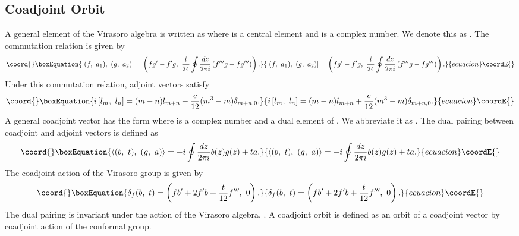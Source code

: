 \documentclass[a4paper,11pt]{article}
\begin{document}
\subsection{Coadjoint Orbit}
A general element of the Virasoro algebra is written as 
\coordHE{} where \coordHE{} is a central element 
and \coordHE{} is a complex number. We denote this as \coordHE{}. 
The commutation relation is given by 
\begin{equation}\coord{}\boxEquation{
\left[(f, \ a_1), \ (g, \ a_2)\right]=
  \left(fg'-f'g, \ \frac{i}{24}\oint \frac{dz}{2\pi i}
      \left(f'''g-fg'''\right)\right).
}{
\left[(f, \ a_1), \ (g, \ a_2)\right]=
  \left(fg'-f'g, \ \frac{i}{24}\oint \frac{dz}{2\pi i}
      \left(f'''g-fg'''\right)\right).
}{ecuacion}\coordE{}\end{equation}
Under this commutation relation, 
adjoint vectors \coordHE{} satisfy 
\begin{equation}\coord{}\boxEquation{
i\left[l_m, \ l_n\right]=(m-n)l_{m+n}+\frac{c}{12}(m^3-m)\delta_{m+n,0}.
}{
i\left[l_m, \ l_n\right]=(m-n)l_{m+n}+\frac{c}{12}(m^3-m)\delta_{m+n,0}.
}{ecuacion}\coordE{}\end{equation}
A general coadjoint vector has the form \coordHE{} 
where \coordHE{} is a complex number and \coordHE{} a dual element of \coordHE{}.
We abbreviate it as \coordHE{}.
The dual pairing between coadjoint and adjoint vectors is defined as 
\begin{equation}\coord{}\boxEquation{
 \langle (b,\ t), \ (g, \ a) \rangle =-i\oint\frac{dz}{2\pi i}b(z)g(z)+ta.
}{
 \langle (b,\ t), \ (g, \ a) \rangle =-i\oint\frac{dz}{2\pi i}b(z)g(z)+ta.
}{ecuacion}\coordE{}\end{equation}
The coadjoint action of the Virasoro group is given by 
\begin{equation}\coord{}\boxEquation{
\label{delta-b}
 \delta_f (b, \ t)=\left(fb'+2f'b+\frac{t}{12}f''', \ 0\right).
}{
\delta_f (b, \ t)=\left(fb'+2f'b+\frac{t}{12}f''', \ 0\right).
}{ecuacion}\coordE{}\end{equation}
The dual pairing is invariant under the action of the Virasoro algebra, 
\coordHE{}.
A coadjoint orbit is defined as an orbit of a coadjoint vector by 
coadjoint action of the conformal group.
\end{document}
